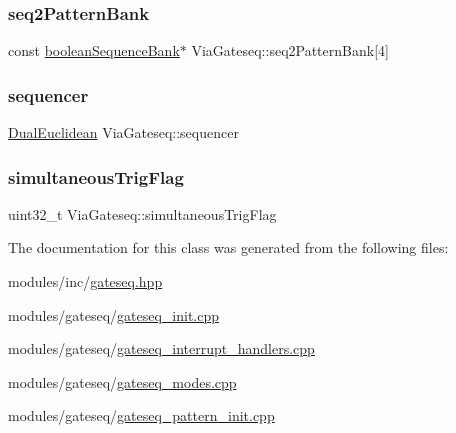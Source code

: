 \mbox{\label{class_via_gateseq_a1faa904a07ea274aeff80dbb18f8518c}} 
\subsubsection{\texorpdfstring{seq2\+Pattern\+Bank}{seq2PatternBank}}
{\footnotesize\ttfamily const \mbox{\hyperlink{structboolean_sequence_bank}{boolean\+Sequence\+Bank}}$\ast$ Via\+Gateseq\+::seq2\+Pattern\+Bank\mbox{[}4\mbox{]}}

\mbox{\label{class_via_gateseq_aade5918995b92e3f1fd8a3b07e0bd7f4}} 
\subsubsection{\texorpdfstring{sequencer}{sequencer}}
{\footnotesize\ttfamily \mbox{\hyperlink{class_dual_euclidean}{Dual\+Euclidean}} Via\+Gateseq\+::sequencer}

\mbox{\label{class_via_gateseq_ab15d726ba5d302f110c2fa9b516aac45}} 
\subsubsection{\texorpdfstring{simultaneous\+Trig\+Flag}{simultaneousTrigFlag}}
{\footnotesize\ttfamily uint32\+\_\+t Via\+Gateseq\+::simultaneous\+Trig\+Flag}



The documentation for this class was generated from the following files\+:\begin{DoxyCompactItemize}
\item 
modules/inc/\mbox{\hyperlink{gateseq_8hpp}{gateseq.\+hpp}}\item 
modules/gateseq/\mbox{\hyperlink{gateseq__init_8cpp}{gateseq\+\_\+init.\+cpp}}\item 
modules/gateseq/\mbox{\hyperlink{gateseq__interrupt__handlers_8cpp}{gateseq\+\_\+interrupt\+\_\+handlers.\+cpp}}\item 
modules/gateseq/\mbox{\hyperlink{gateseq__modes_8cpp}{gateseq\+\_\+modes.\+cpp}}\item 
modules/gateseq/\mbox{\hyperlink{gateseq__pattern__init_8cpp}{gateseq\+\_\+pattern\+\_\+init.\+cpp}}\end{DoxyCompactItemize}
